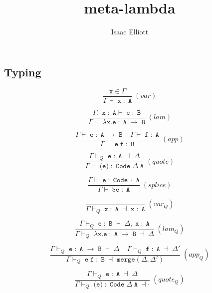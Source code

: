 \documentclass{article}
\title{meta-lambda}
\author{Isaac Elliott}
\begin{document}
\maketitle

\subsection{Typing}

$$
\frac
  {\texttt{x} \in \Gamma}
  {\Gamma \vdash \; \texttt{x} \; : \; \texttt{A} }
  \; (var)
$$

$$
\frac
  {\Gamma, \; \texttt{x} \; : \; \texttt{A} \vdash \; \texttt{e} \; : \; \texttt{B}}
  {\Gamma \vdash \; \lambda \texttt{x.} \texttt{e} \; : \; \texttt{A} \; \rightarrow \; \texttt{B}}
  \; (lam)
$$

$$
\frac
  {
    \Gamma \vdash \; \texttt{e} \; : \; \texttt{A} \; \rightarrow \; \texttt{B}
    \; \; \; \;
    \Gamma \vdash \; \texttt{f} \; : \; \texttt{A}
  }
  {\Gamma \vdash \; \texttt{e} \; \texttt{f} \; : \; \texttt{B}}
  \; (app)
$$

$$
\frac
  {\Gamma \vdash_{Q} \; \texttt{e} \; : \; \texttt{A} \; \dashv \; \Delta}
  {\Gamma \vdash \; \texttt{\`(e)} \; : \; \texttt{Code} \; \Delta \; \texttt{A}}
  \; (quote)
$$

$$
\frac
  {\Gamma \vdash \; \texttt{e} \; : \; \texttt{Code} \; \cdot \; \texttt{A}}
  {\Gamma \vdash \; \texttt{\$} \texttt{e} \; : \; \texttt{A}}
  \; (splice)
$$

$$
\frac
  {}
  {\Gamma \vdash_{Q} \; \texttt{x} \; : \; \texttt{A} \; \dashv \; \texttt{x} \; : \; \texttt{A}}
  \; (var_Q)
$$

$$
\frac
    {\Gamma \vdash_{Q} \; \texttt{e} \; : \; \texttt{B} \; \dashv \; \Delta, \; \texttt{x} \; : \; \texttt{A}}
    {\Gamma \vdash_{Q} \; \lambda \texttt{x.} \texttt{e} \; : \; \texttt{A} \; \rightarrow \; \texttt{B} \; \dashv \; \Delta}
    \; (lam_Q)
$$

$$
\frac
    {
      \Gamma \vdash_{Q} \; \texttt{e} \; : \; \texttt{A} \; \rightarrow \; \texttt{B} \; \dashv \; \Delta
      \; \; \; \;
      \Gamma \vdash_{Q} \; \texttt{f} \; : \; \texttt{A} \; \dashv \; \Delta'
    }
    {\Gamma \vdash_{Q} \; \texttt{e} \; \texttt{f} \; : \; \texttt{B} \; \dashv \; \texttt{merge}(\Delta, \Delta')}
    \; (app_Q)
$$

$$
\frac
  {\Gamma \vdash_{Q} \; \texttt{e} \; : \; \texttt{A} \; \dashv \; \Delta}
  {\Gamma \vdash_{Q} \; \texttt{\`(e)} \; : \; \texttt{Code} \; \Delta \; \texttt{A} \; \dashv \cdot}
  \; (quote_{Q})
$$
\end{document}
